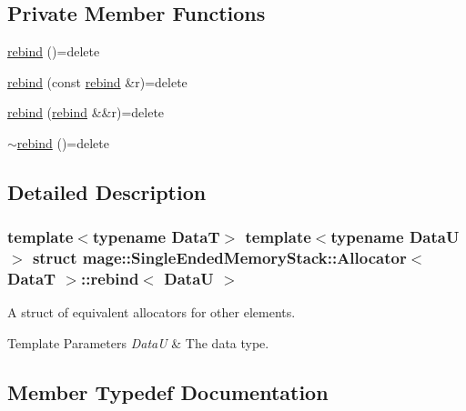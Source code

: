 \subsection*{Private Member Functions}
\begin{DoxyCompactItemize}
\item 
\hyperlink{structmage_1_1_single_ended_memory_stack_1_1_allocator_1_1rebind_a4ba91415d43d61d53cd997be987edcbc}{rebind} ()=delete
\item 
\hyperlink{structmage_1_1_single_ended_memory_stack_1_1_allocator_1_1rebind_a35f57e484c52757b1bc93ff04bbce813}{rebind} (const \hyperlink{structmage_1_1_single_ended_memory_stack_1_1_allocator_1_1rebind}{rebind} \&r)=delete
\item 
\hyperlink{structmage_1_1_single_ended_memory_stack_1_1_allocator_1_1rebind_ad378b1bdb6fac89d6d8df68ea66d12da}{rebind} (\hyperlink{structmage_1_1_single_ended_memory_stack_1_1_allocator_1_1rebind}{rebind} \&\&r)=delete
\item 
\hyperlink{structmage_1_1_single_ended_memory_stack_1_1_allocator_1_1rebind_ac5560de51fdd40828b0b82f7975199d1}{$\sim$rebind} ()=delete
\end{DoxyCompactItemize}


\subsection{Detailed Description}
\subsubsection*{template$<$typename DataT$>$\newline
template$<$typename DataU$>$\newline
struct mage\+::\+Single\+Ended\+Memory\+Stack\+::\+Allocator$<$ Data\+T $>$\+::rebind$<$ Data\+U $>$}

A struct of equivalent allocators for other elements.


\begin{DoxyTemplParams}{Template Parameters}
{\em DataU} & The data type. \\
\hline
\end{DoxyTemplParams}


\subsection{Member Typedef Documentation}
\hypertarget{structmage_1_1_single_ended_memory_stack_1_1_allocator_1_1rebind_a8046a39ba6854ffa75978d58b0aafa02}{}\label{structmage_1_1_single_ended_memory_stack_1_1_allocator_1_1rebind_a8046a39ba6854ffa75978d58b0aafa02} 
